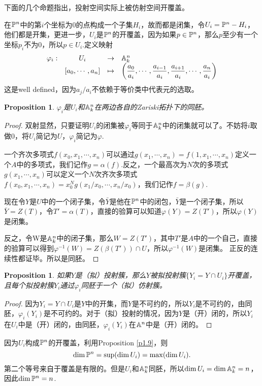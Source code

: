 \documentclass[9pt]{extbook}
\theoremstyle{plain}%
\newtheorem{pro}[defi]{Proposition}%
\begin{document}
下面的几个命题指出，投射空间实际上被仿射空间开覆盖。

在$\mathbb{P}^n$中的第$i$个坐标为$0$的点构成一个子集$H_i$，故而都是闭集，令$U_i=\mathbb{P}^n-H_i$，他们都是开集，更进一步，$U_i$是$\mathbb{P}^n$的开覆盖，因为如果$p\in \mathbb{P}^n$，那么$p$至少有一个坐标$p_i$不为$0$，所以$p\in U_i$.定义映射
\[
	\begin{array}{lccl}
		\varphi_i:&U_i&\to& \mathbb{A}^n_k\\
		&[a_0,\cdots ,a_n]&\mapsto&\displaystyle{\left(\frac{a_0}{a_i},\cdots ,\frac{a_{i-1}}{a_i},\frac{a_{i+1}}{a_i},\cdots,\frac{a_n}{a_i}\right)}
	\end{array}
\]
这是well defined，因为$a_j/a_i$不依赖于等价类中代表元的选取。

\begin{pro}
$\varphi_i$是$U_i$和$\mathbb{A}^n_k$在两边各自的Zariski拓扑下的同胚。
\end{pro}
\begin{proof}
双射显然，只要证明$U_i$的闭集被$\varphi_i$等同于$\mathbb{A}^n_k$中的闭集就可以了。不妨将$i$取做$0$，将$U_i$简记为$U$，$\varphi_i$简记为$\varphi$.

一个齐次多项式$f(x_0,x_1,\cdots ,x_n)$可以通过$g(x_1,\cdots ,x_n)=f(1,x_1,\cdots ,x_n)$定义一个$A$中的多项式，我们记作$g=\alpha(f)$.反之，一个最高次为$N$次的多项式$g(x_1,\cdots ,x_n)$可以定义一个$N$次齐次多项式$f(x_0,x_1,\cdots ,x_n)=x_0^Ng(x_1/x_0,\cdots ,x_n/x_0)$，我们记作$f=\beta(g)$.

现在令$Y$是$U$中的一个闭子集，令$\bar{Y}$是他在$\mathbb{P}^n$中的闭包，$\bar{Y}$是一个闭子集，所以$\bar{Y}=Z(T)$，令$T'=\alpha(T)$，直接的验算可以知道$\varphi(Y)=Z(T')$，所以$\varphi(Y)$是闭集。

反之，令W是$\mathbb{A}^n_k$中的闭子集，那么$W=Z(T')$，其中$T'$是$A$中的一个自己，直接的验算可以得到$\varphi^{-1}(W)=Z(\beta(T'))\cap U$，所以$\varphi^{-1}(W)$是闭集。
正反的连续性都证毕。所以是同胚。
\end{proof}
\begin{pro}
	如果$Y$是（拟）投射簇，那么$Y$被拟投射簇$\{Y_i=Y\cap U_i\}$开覆盖，且每个拟投射簇$Y_i$通过$\varphi_i$同胚于一个（拟）仿射簇。
	\label{c2:p8}
\end{pro}
\begin{proof}
因为$Y_i=Y\cap U_i$是$Y$中的开集，而$Y$是不可约的，所以$Y_i$是不可约的，由同胚，$\varphi_i(Y_i)$是不可约的。对于（拟）投射的情况，因为$Y$是（开）闭的，所以$Y_i$在$U_i$中是（开）闭的，由同胚，$\varphi_i(Y_i)$在$\mathbb{A}^n$中是（开）闭的。
\end{proof}

因为$U_i$构成$\mathbb{P}^n$的开覆盖，利用Proposition \ref{p1.9}，则
\[
	\dim  \mathbb{P}^n=\sup(\dim U_i)=\max(\dim U_i).
\]
第二个等号来自于覆盖是有限的。但是$U_i$和$\mathbb{A}^n_k$同胚，所以$\dim U_i=\dim \mathbb{A}^n_k=n$，因此$\dim  \mathbb{P}^n=n$.
\end{document}
